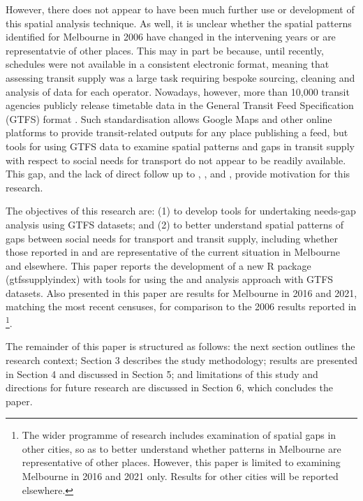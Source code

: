 \documentclass[preprint, 3p,
authoryear]{elsarticle} %
\begin{document}
However, there does not appear to have been much further use or
development of this spatial analysis technique. As well, it is unclear
whether the spatial patterns identified for Melbourne in 2006 have
changed in the intervening years or are representatvie of other places.
This may in part be because, until recently, schedules were not
available in a consistent electronic format, meaning that assessing
transit supply was a large task requiring bespoke sourcing, cleaning and
analysis of data for each operator. Nowadays, however, more than 10,000
transit agencies publicly release timetable data in the General Transit
Feed Specification (GTFS) format \citep{GTFS}. Such standardisation
allows Google Maps and other online platforms to provide transit-related
outputs for any place publishing a feed, but tools for using GTFS data
to examine spatial patterns and gaps in transit supply with respect to
social needs for transport do not appear to be readily available. This
gap, and the lack of direct follow up to \citet{Currie2003Hobart},
\citet{Currie2004Gap}, \citet{Currie2007Identifying} and
\citet{currie2010identifying}, provide motivation for this research.

The objectives of this research are: (1) to develop tools for
undertaking needs-gap analysis using GTFS datasets; and (2) to better
understand spatial patterns of gaps between social needs for transport
and transit supply, including whether those reported in
\citet{Currie2007Identifying} and \citet{currie2010identifying} are
representative of the current situation in Melbourne and elsewhere. This
paper reports the development of a new R package (gtfssupplyindex) with
tools for using the \citet{Currie2007Identifying} and
\citet{currie2010identifying} analysis approach with GTFS datasets. Also
presented in this paper are results for Melbourne in 2016 and 2021,
matching the most recent censuses, for comparison to the 2006 results
reported in \citet{currie2010identifying}\footnote{The wider programme
  of research includes examination of spatial gaps in other cities, so
  as to better understand whether patterns in Melbourne are
  representative of other places. However, this paper is limited to
  examining Melbourne in 2016 and 2021 only. Results for other cities
  will be reported elsewhere.}.

The remainder of this paper is structured as follows: the next section
outlines the research context; Section 3 describes the study
methodology; results are presented in Section 4 and discussed in Section
5; and limitations of this study and directions for future research are
discussed in Section 6, which concludes the paper.
\end{document}
